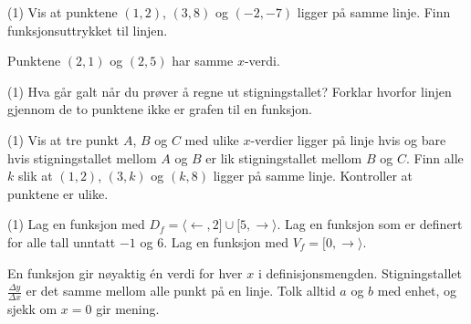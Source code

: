 \begin{tasks}(1)
  \task Vis at punktene $(1, 2)$, $(3, 8)$ og $(-2, -7)$ ligger på samme linje.
  \task Finn funksjonsuttrykket til linjen.
\end{tasks}

Punktene $(2, 1)$ og $(2, 5)$ har samme $x$-verdi.
\begin{tasks}(1)
  \task Hva går galt når du prøver å regne ut stigningstallet?
  \task Forklar hvorfor linjen gjennom de to punktene ikke er grafen til en funksjon.
\end{tasks}


\begin{tasks}(1)
  \task Vis at tre punkt $A$, $B$ og $C$ med ulike $x$-verdier ligger på linje hvis og bare hvis stigningstallet mellom $A$ og $B$ er lik stigningstallet mellom $B$ og $C$.
  \task Finn alle $k$ slik at $(1, 2)$, $(3, k)$ og $(k, 8)$ ligger på samme linje. Kontroller at punktene er ulike.
\end{tasks}

\begin{tasks}(1)
  \task Lag en funksjon med $D_f = \langle\leftarrow, 2] \cup [5, \rightarrow\rangle$.
  \task Lag en funksjon som er definert for alle tall unntatt $-1$ og $6$.
  \task Lag en funksjon med $V_f = [0, \rightarrow\rangle$.
\end{tasks}

\begin{oppsummering}
En funksjon gir nøyaktig én verdi for hver $x$ i definisjonsmengden. Stigningstallet $\frac{\Delta y}{\Delta x}$ er det samme mellom alle punkt på en linje.
Tolk alltid $a$ og $b$ med enhet, og sjekk om $x = 0$ gir mening.
\end{oppsummering}
